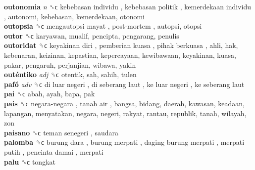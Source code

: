 \textbf{outonomia} \emph{n}  ␝ϲ   kebebasan individu ,  kebebasan politik ,  kemerdekaan individu , autonomi, kebebasan, kemerdekaan, otonomi  \\
\textbf{outopsia} ␝ϲ   mengautopsi mayat ,  post-mortem , autopsi, otopsi  \\
\textbf{outor} ␝ϲ  karyawan, mualif, pencipta, pengarang, penulis  \\
\textbf{outoridat} ␝ϲ   keyakinan diri ,  pemberian kuasa ,  pihak berkuasa , ahli, hak, kebenaran, keizinan, kepastian, kepercayaan, kewibawaan, keyakinan, kuasa, pakar, pengaruh, perjanjian, wibawa, yakin  \\
\textbf{outéntiko} \emph{adj}  ␝ϲ  otentik, sah, sahih, tulen  \\
\textbf{pafó} \emph{adv}  ␝ϲ   di luar negeri ,  di seberang laut ,  ke luar negeri ,  ke seberang laut   \\
\textbf{pai} ␝ϲ  abah, ayah, bapa, pak  \\
\textbf{pais} ␝ϲ   negara-negara ,  tanah air , bangsa, bidang, daerah, kawasan, keadaan, lapangan, menyatakan, negara, negeri, rakyat, rantau, republik, tanah, wilayah, zon  \\
\textbf{paisano} ␝ϲ   teman senegeri , saudara  \\
\textbf{palomba} ␝ϲ   burung dara ,  burung merpati ,  daging burung merpati ,  merpati putih ,  pencinta damai , merpati  \\
\textbf{palu} ␝ϲ  tongkat  \\
